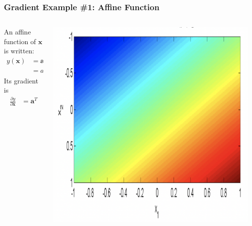 \documentclass{beamer}
\begin{document}
\begin{frame}
  \frametitle{Gradient Example \#1: Affine Function}
    \begin{columns}
    \begin{column}{0.5\textwidth}
      An affine function of $\mathbf{x}$ is written:
      \begin{align*}
        y(\mathbf{x}) &= \mathbf{a}^T\mathbf{x}+b\\
        &=a_1x_1+a_2x_2+b
      \end{align*}
      Its gradient is
      \begin{align*}
        \frac{\partial y}{\partial\mathbf{x}}
        &=\mathbf{a}^T
      \end{align*}        
    \end{column}
    \begin{column}{0.5\textwidth}
      \centerline{\includegraphics[width=\textwidth]{figs/constant_gradient.png}}
    \end{column}
  \end{columns}
\end{frame}
\end{document}
